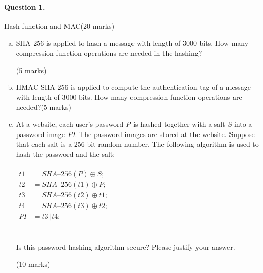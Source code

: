 \documentclass[12pt]{article}
\begin{document}
\paragraph{Question 1.}   Hash function and MAC\hfill (20 marks)
\begin{enumerate}[(a)]
    \item SHA-256 is applied to hash a message with length of 3000 bits. How many compression function operations are needed in the hashing?{\vspace{-1em}\begin{flushright} (5 marks)\end{flushright}}
    \item HMAC-SHA-256 is applied to compute the authentication tag of a message with length of 3000 bits. How many compression function operations are needed?\hfill (5 marks)
    \item At a website, each user's password \textit{P} is hashed together with a salt \textit{S} into a password image \textit{PI}. The password images are stored at the website. Suppose that each salt is a 256-bit random number. The following algorithm is used to hash the password and the salt:\\\\$\begin{aligned}
    t1&=\textit{SHA--}256(P)\oplus S;\\
    t2&=\textit{SHA--}256(t1)\oplus P;\\
    t3&=\textit{SHA--}256(t2)\oplus t1;
\\
t4&=\textit{SHA--}256(t3)\oplus t2;\\
PI&=t3||t4;
    \end{aligned}$\\\\\\
    Is this password hashing algorithm secure? Please justify your answer.{\vspace{-1em}\begin{flushright} (10 marks)\end{flushright}}
\end{enumerate}
\end{document}
